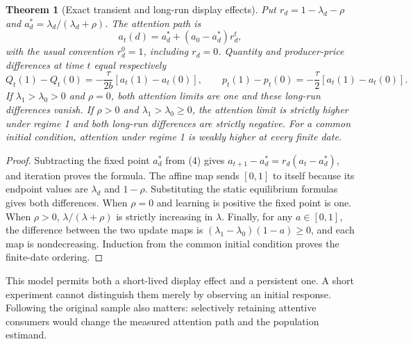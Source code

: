 \documentclass[11pt]{article}
\newtheorem{theorem}{Theorem}
\theoremstyle{remark}\newtheorem{remark}[theorem]{Remark}
\begin{document}
\begin{theorem}[Exact transient and long-run display effects]
Put $r_d=1-\lambda_d-\rho$ and $a_d^*=\lambda_d/(\lambda_d+\rho)$. The attention path is
\[
 a_t(d)=a_d^*+(a_0-a_d^*)r_d^t,
\]
with the usual convention $r_d^0=1$, including $r_d=0$. Quantity and producer-price differences at time $t$ equal respectively
\[
 Q_t(1)-Q_t(0)=-\frac\tau{2b}[a_t(1)-a_t(0)],\qquad
 p_t(1)-p_t(0)=-\frac\tau2[a_t(1)-a_t(0)].
\]
If $\lambda_1>\lambda_0>0$ and $\rho=0$, both attention limits are one and these long-run differences vanish. If $\rho>0$ and $\lambda_1>\lambda_0\ge0$, the attention limit is strictly higher under regime 1 and both long-run differences are strictly negative. For a common initial condition, attention under regime 1 is weakly higher at every finite date.
\end{theorem}
\begin{proof}
Subtracting the fixed point $a_d^*$ from (4) gives $a_{t+1}-a_d^*=r_d(a_t-a_d^*)$, and iteration proves the formula. The affine map sends $[0,1]$ to itself because its endpoint values are $\lambda_d$ and $1-\rho$. Substituting the static equilibrium formulas gives both differences. When $\rho=0$ and learning is positive the fixed point is one. When $\rho>0$, $\lambda/(\lambda+\rho)$ is strictly increasing in $\lambda$. Finally, for any $a\in[0,1]$, the difference between the two update maps is $(\lambda_1-\lambda_0)(1-a)\ge0$, and each map is nondecreasing. Induction from the common initial condition proves the finite-date ordering.
\end{proof}

This model permits both a short-lived display effect and a persistent one. A short experiment cannot distinguish them merely by observing an initial response. Following the original sample also matters: selectively retaining attentive consumers would change the measured attention path and the population estimand.
\end{document}
